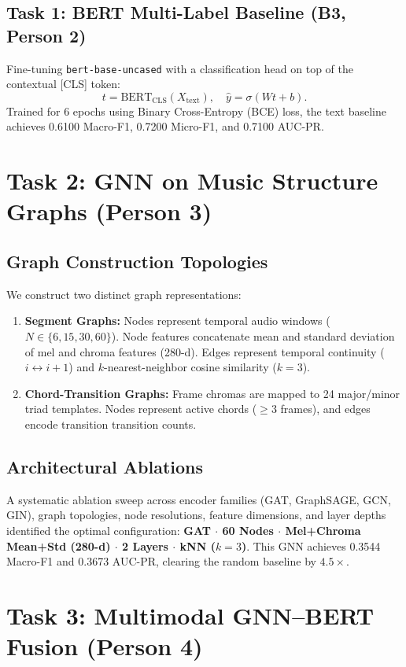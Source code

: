 \documentclass[conference]{IEEEtran}
\begin{document}
\subsection{Task 1: BERT Multi-Label Baseline (B3, Person 2)}
Fine-tuning \texttt{bert-base-uncased} with a classification head on top of the contextual [CLS] token:
$$t = \text{BERT}_{\text{CLS}}(X_{\text{text}}), \quad \hat{y} = \sigma(W t + b).$$
Trained for 6 epochs using Binary Cross-Entropy (BCE) loss, the text baseline achieves 0.6100 Macro-F1, 0.7200 Micro-F1, and 0.7100 AUC-PR.

\section{Task 2: GNN on Music Structure Graphs (Person 3)}
\subsection{Graph Construction Topologies}
We construct two distinct graph representations:
\begin{enumerate}
    \item \textbf{Segment Graphs:} Nodes represent temporal audio windows ($N \in \{6, 15, 30, 60\}$). Node features concatenate mean and standard deviation of mel and chroma features (280-d). Edges represent temporal continuity ($i \leftrightarrow i+1$) and $k$-nearest-neighbor cosine similarity ($k=3$).
    \item \textbf{Chord-Transition Graphs:} Frame chromas are mapped to 24 major/minor triad templates. Nodes represent active chords ($\ge 3$ frames), and edges encode transition transition counts.
\end{enumerate}

\subsection{Architectural Ablations}
A systematic ablation sweep across encoder families (GAT, GraphSAGE, GCN, GIN), graph topologies, node resolutions, feature dimensions, and layer depths identified the optimal configuration:
\textbf{GAT $\cdot$ 60 Nodes $\cdot$ Mel+Chroma Mean+Std (280-d) $\cdot$ 2 Layers $\cdot$ kNN ($k=3$)}.
This GNN achieves 0.3544 Macro-F1 and 0.3673 AUC-PR, clearing the random baseline by $4.5\times$.

\section{Task 3: Multimodal GNN–BERT Fusion (Person 4)}
\end{document}
